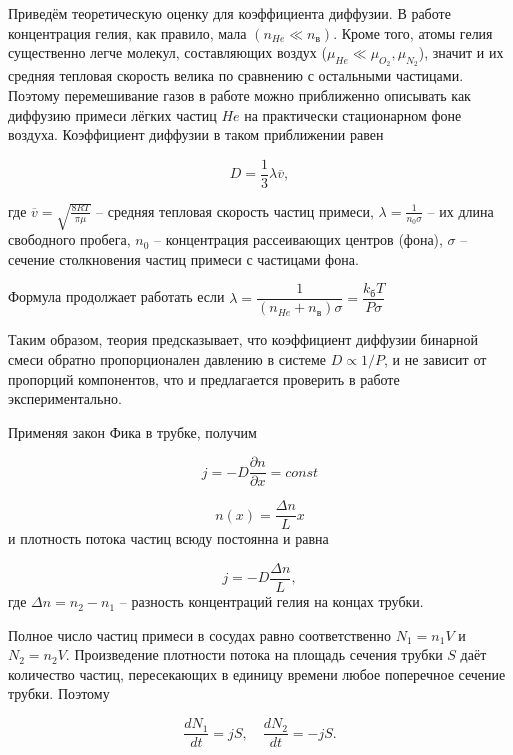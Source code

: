 \documentclass[a4paper,12pt]{article}
\begin{document}
	Приведём теоретическую оценку для коэффициента диффузии. В работе концентрация гелия, как правило, мала $ (n_{He} \ll n_\text{в}) $. Кроме того, атомы гелия существенно легче молекул, составляющих воздух ($ \mu_{He} \ll \mu_{O_2}, \mu_{N_2} $), значит и их средняя тепловая скорость велика по сравнению с остальными частицами. Поэтому перемешивание газов в работе можно приближенно описывать как диффузию примеси лёгких частиц $ He $ на практически стационарном фоне воздуха. Коэффициент диффузии в таком приближении равен
	
	\begin{equation}
		D=\dfrac{1}{3}\lambda 	\overline{v},
	\end{equation}
	
	где $ \overline{v}=\sqrt{\frac{8RT}{\pi \mu}} $ -- средняя тепловая скорость частиц примеси, $ \lambda = \frac{1}{n_0\sigma} $ -- их длина свободного пробега, $ n_0 $ -- концентрация рассеивающих центров (фона), $ \sigma $ -- сечение столкновения частиц примеси с частицами фона.
	
    Формула продолжает работать если $ \lambda = \dfrac{1}{(n_{He} + n_в)\sigma} = \dfrac{k_{б} T}{P \sigma}$

	Таким образом, теория предсказывает, что коэффициент диффузии бинарной смеси обратно пропорционален давлению в системе $ D \propto 1/P $, и не зависит от пропорций компонентов, что и предлагается проверить в работе экспериментально.
	
    Применяя закон Фика в трубке, получим

    \[ j=-D\frac{\partial n}{\partial x} = const \]

    \begin{equation}
    n(x) = \frac{\Delta n}{L} x
    \end{equation}
    и плотность потока частиц всюду постоянна и равна

    \begin{equation}
    j=-D\frac{\Delta n}{L},
    \end{equation}
    где $ \Delta n = n_2-n_1 $ -- разность концентраций гелия на концах трубки.

    Полное число частиц примеси в сосудах равно соответственно $ N_1=n_1V $ и $ N_2=n_2V $. Произведение плотности потока на площадь сечения трубки $ S $ даёт количество частиц, пересекающих в единицу времени любое поперечное сечение трубки. Поэтому

    \begin{equation}
    \frac{dN_1}{dt}=jS, \quad \frac{dN_2}{dt}=-jS.
    \end{equation}
\end{document}
